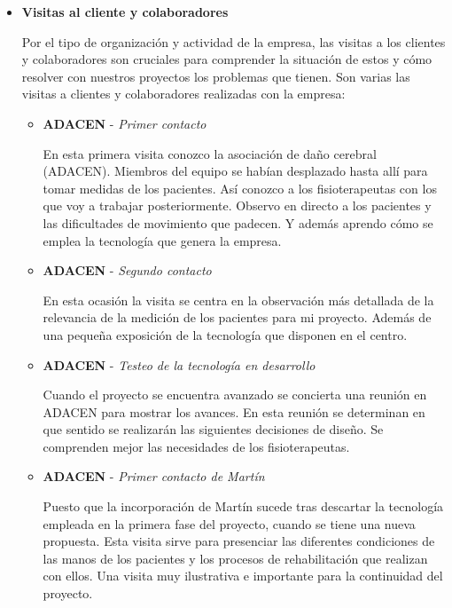 		\begin{itemize}
			\item \textbf{Visitas al cliente y colaboradores} 
			
			\smallskip
				Por el tipo de organización y actividad de la empresa, las visitas a los clientes y colaboradores son cruciales para comprender la situación de estos y cómo resolver con nuestros proyectos los problemas que tienen. Son varias las visitas a clientes y colaboradores realizadas con la empresa:
				
				\begin{itemize}
					\item \textbf{ADACEN} - \textit{Primer contacto} 
					
					\smallskip	
					En esta primera visita conozco la asociación de daño cerebral (ADACEN). Miembros del equipo se habían desplazado hasta allí para tomar medidas de los pacientes. Así conozco a los fisioterapeutas con los que voy a trabajar posteriormente. Observo en directo a los pacientes y las dificultades de movimiento que padecen. Y además aprendo cómo se emplea la tecnología que genera la empresa.
					\smallskip
					
					\item \textbf{ADACEN} - \textit{Segundo contacto} 
					
					\smallskip	
					En esta ocasión la visita se centra en la observación más detallada de la relevancia de la medición de los pacientes para mi proyecto. Además de una pequeña exposición de la tecnología que disponen en el centro.
					\smallskip
					
					\item \textbf{ADACEN} - \textit{Testeo de la tecnología en desarrollo} 
					
					\smallskip	
					Cuando el proyecto se encuentra avanzado se concierta una reunión en ADACEN para mostrar los avances. En esta reunión se determinan en que sentido se realizarán las siguientes decisiones de diseño. Se comprenden mejor las necesidades de los fisioterapeutas.
					\smallskip
					
					\item \textbf{ADACEN} - \textit{Primer contacto de Martín} 
					
					\smallskip	
					Puesto que la incorporación de Martín sucede tras descartar la tecnología empleada en la primera fase del proyecto, cuando se tiene una nueva propuesta. Esta visita sirve para presenciar las diferentes condiciones de las manos de los pacientes y los procesos de rehabilitación que realizan con ellos. Una visita muy ilustrativa e importante para la continuidad del proyecto.
					\smallskip
					

\end{itemize}
\end{itemize}
